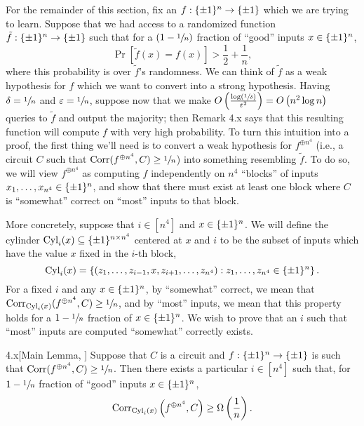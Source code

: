 \documentclass[11pt]{article}
\begin{document}
For the remainder of this section, fix an $f : \{\pm 1\}^n \rightarrow \{\pm 1\}$ which we are trying to learn. Suppose that we had access to a randomized function $\tilde{f} : \{\pm 1\}^n \rightarrow \{\pm 1\}$ such that for a $(1 - \sfrac{1}{n})$ fraction of ``good'' inputs $x \in \{\pm 1\}^n$, 
\begin{equation*}
    \Pr[\tilde{f}(x) = f(x)] > \frac{1}{2} + \frac{1}{n},
\end{equation*}
where this probability is over $\tilde{f}$'s randomness. We can think of $\tilde{f}$ as a weak hypothesis for $f$ which we want to convert into a strong hypothesis. Having $\delta = \sfrac{1}{n}$ and $\varepsilon = \sfrac{1}{n}$, suppose now that we make $O\left(\frac{\log (\sfrac{1}{\delta})}{\varepsilon^2}\right) = O\left(n^2 \log n\right)$ queries to $\tilde{f}$ and output the majority; then Remark 4.x says that this resulting function will compute $f$ with very high probability. To turn this intuition into a proof, the first thing we'll need is to convert a weak hypothesis for $f^{\oplus n^4}$ (i.e., a circuit $C$ such that $\mathrm{Corr}(f^{\oplus n^4}, C) \geq \sfrac{1}{n}$) into something resembling $\tilde{f}$. To do so, we will view $f^{\oplus n^4}$ as computing $f$ independently on $n^4$ ``blocks'' of inputs $x_1, \ldots, x_{n^4} \in \{\pm 1\}^n$, and show that there must exist at least one block where $C$ is ``somewhat'' correct on ``most'' inputs to that block.

More concretely, suppose that $i \in [n^4]$ and $x \in \{\pm 1\}^n$. We will define the cylinder $\textup{Cyl}_i(x) \subseteq \{\pm 1\}^{n \times n^4}$ centered at $x$ and $i$ to be the subset of inputs which have the value $x$ fixed in the $i$-th block,
\begin{equation*}
    \textup{Cyl}_i(x) = \left\{(z_1, \ldots, z_{i - 1}, x, z_{i + 1}, \ldots, z_{n^4}) : z_1, \ldots, z_{n^4} \in \{\pm 1\}^n\right\}.
\end{equation*}
For a fixed $i$ and any $x \in \{\pm 1\}^n$, by ``somewhat'' correct, we mean that $\mathrm{Corr}_{\textup{Cyl}_i(x)}(f^{\oplus n^4}, C) \geq \sfrac{1}{n}$, and by ``most'' inputs, we mean that this property holds for a $1 - \sfrac{1}{n}$ fraction of $x \in \{\pm 1\}^n$. We wish to prove that an $i$ such that ``most'' inputs are computed ``somewhat'' correctly exists.

\begin{lemma}{4.x}[Main Lemma, \cite{BonehLipton}]
    Suppose that $C$ is a circuit and $f : \{\pm 1\}^n \rightarrow \{\pm 1\}$ is such that $\mathrm{Corr}(f^{\oplus n^4}, C) \geq \sfrac{1}{n}$. Then there exists a particular $i \in [n^4]$ such that, for $1 - \sfrac{1}{n}$ fraction of ``good'' inputs $x \in \{\pm 1\}^n$,
    \begin{equation*}
        \mathrm{Corr}_{\textup{Cyl}_i(x)}\left(f^{\oplus n^4}, C\right) \geq \Omega\left(\frac{1}{n}\right).
    \end{equation*}
\end{lemma}
\end{document}
